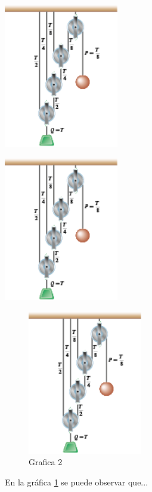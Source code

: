 \documentclass{article}
\begin{document}
\begin{center}
\includegraphics[width=5cm]{Grafica1.png}
\end{center}


\begin{center}
\includegraphics[width=5cm]{images/Grafica2.png}
\end{center}


\begin{figure}[H]
  \centering
  \includegraphics[width=5cm]{images/Grafica2.png}
  \caption{Grafica 2}
  \label{fig:grafica2}
\end{figure}

En la gráfica \ref{fig:grafica2} se puede observar que...


\begin{center}
\end{center}
\end{document}
